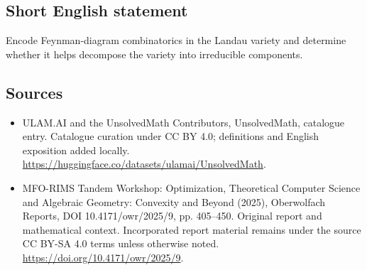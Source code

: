 \documentclass[11pt]{article}
\begin{document}
\subsection{Short English statement}
Encode Feynman-diagram combinatorics in the Landau variety and determine whether it helps decompose the variety into irreducible components.
\subsection{Sources}
\begin{itemize}
\item[\hypertarget{source:statement:1}{S1}] ULAM.AI and the UnsolvedMath Contributors, UnsolvedMath, catalogue entry. Catalogue curation under CC BY 4.0; definitions and English exposition added locally.
\url{https://huggingface.co/datasets/ulamai/UnsolvedMath}.
\item[\hypertarget{source:statement:2}{S2}] MFO-RIMS Tandem Workshop: Optimization, Theoretical Computer Science and Algebraic Geometry: Convexity and Beyond (2025), Oberwolfach Reports, DOI 10.4171/owr/2025/9, pp. 405--450. Original report and mathematical context. Incorporated report material remains under the source CC BY-SA 4.0 terms unless otherwise noted.
\url{https://doi.org/10.4171/owr/2025/9}.
\end{itemize}
\label{end:statement}
\end{document}
